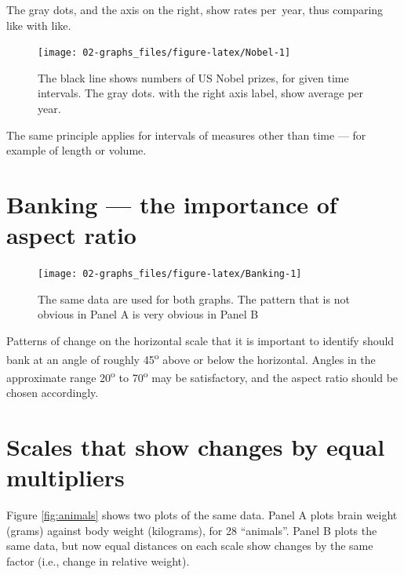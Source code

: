 \documentclass[
  10pt,
  b5paper]{book}
\begin{document}
The gray dots, and the axis on the right, show rates per~year,
thus comparing like with like.

\begin{figure}[H]

{\centering \texttt{[image: 02-graphs\_files/figure-latex/Nobel-1]} 

}

\caption{The black line shows numbers of US Nobel prizes, for given time intervals. The gray dots. with the right axis label, show average per year.}\label{fig:Nobel}
\end{figure}

The same principle applies for intervals of measures
other than time --- for example of length or volume.

\hypertarget{banking-the-importance-of-aspect-ratio}{%
\section{Banking --- the importance of aspect ratio}\label{banking-the-importance-of-aspect-ratio}}

\begin{figure}[H]

{\centering \texttt{[image: 02-graphs\_files/figure-latex/Banking-1]} 

}

\caption{The same data are used for both graphs.  The pattern that is not
obvious in Panel A is very obvious in Panel B}\label{fig:Banking}
\end{figure}

Patterns of change on the horizontal scale that it is
important to identify should bank at an angle of roughly 45\textsuperscript{o}
above or below the horizontal. Angles in
the approximate range 20\textsuperscript{o} to 70\textsuperscript{o} may be satisfactory,
and the aspect ratio should be chosen accordingly.

\hypertarget{scales-that-show-changes-by-equal-multipliers}{%
\section{Scales that show changes by equal multipliers}\label{scales-that-show-changes-by-equal-multipliers}}

Figure \ref{fig:animals} shows two plots of the same data.
Panel A plots brain weight (grams) against body weight (kilograms),
for 28 ``animals''. Panel B plots the same data, but now equal distances
on each scale show changes by the same factor (i.e., change in relative
weight).
\end{document}
